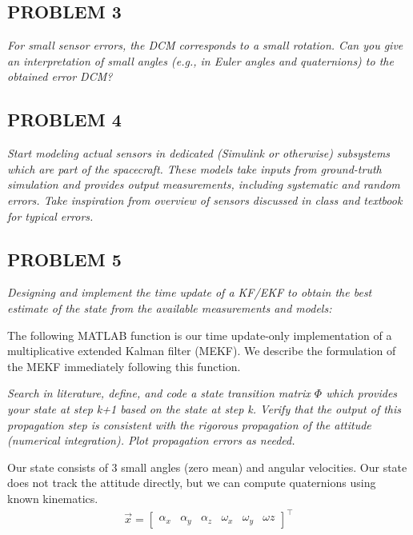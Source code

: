 \subsection{PROBLEM 3}
\textit{For small sensor errors, the DCM corresponds to a small rotation. Can you give an interpretation of small angles (e.g., in Euler angles and quaternions) to the obtained error DCM?}

\subsection{PROBLEM 4}
\textit{Start modeling actual sensors in dedicated (Simulink or otherwise) subsystems which are part of the spacecraft. These models take inputs from ground-truth simulation and provides output measurements, including systematic and random errors. Take inspiration from overview of sensors discussed in class and textbook for typical errors.}

\subsection{PROBLEM 5}
\textit{Designing and implement the time update of a KF/EKF to obtain the best estimate of the state from the available measurements and models:}

The following MATLAB function is our time update-only implementation of a multiplicative extended Kalman filter (MEKF). We describe the formulation of the MEKF immediately following this function.



\textit{Search in literature, define, and code a state transition matrix $\Phi$ which provides your state at step k+1 based on the state at step k. Verify that the output of this propagation step is consistent with the rigorous propagation of the attitude (numerical integration). Plot propagation errors as needed.}

Our state consists of 3 small angles (zero mean) and angular velocities. Our state does not track the attitude directly, but we can compute quaternions using known kinematics.
\begin{align*}
    \Vec{x} = \begin{bmatrix}
        \alpha_{x} & \alpha_{y} & \alpha_{z} & \omega_{x} & \omega_{y} & \omega{z}
    \end{bmatrix}^{\intercal}
\end{align*}

